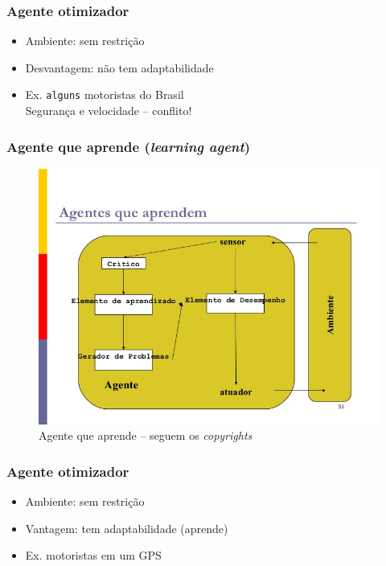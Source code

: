 
\begin{frame} %

    \frametitle{Agente otimizador}

\begin{itemize}
  \item Ambiente: sem restrição
  
  \item Desvantagem: não  tem adaptabilidade
  
  \item Ex. \texttt{alguns} motoristas do Brasil\\
    Segurança e velocidade – conflito!
  
\end{itemize}
\end{frame}




\begin{frame} %

 \frametitle{Agente que aprende (\textit{learning agent})}

\begin{figure}[!ht]
  \centering
  \includegraphics[height =.6\textheight,width=.7\textwidth]
  {figuras/agentes_que_aprendem.jpg}
  \caption{Agente que aprende -- seguem os \textit{copyrights}}
\end{figure}

\end{frame}




\begin{frame} %

    \frametitle{Agente otimizador}

\begin{itemize}
  \item Ambiente: sem restrição
  
  \item Vantagem:  tem adaptabilidade (aprende)
  
  \item Ex.  motoristas em um GPS
  
\end{itemize}
\end{frame}





